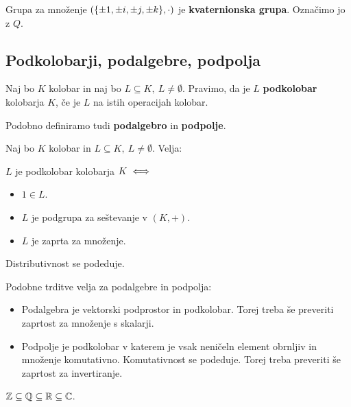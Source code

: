Grupa za množenje $(\{\pm 1, \pm i, \pm j, \pm k\}, \cdot)$ je \textbf{kvaternionska grupa}. Označimo jo z $Q$.

\subsection{Podkolobarji, podalgebre, podpolja}
\begin{definicija}
    Naj bo $K$ kolobar in naj bo $L \subseteq K, \ L \neq \emptyset$. Pravimo, da je $L$ \textbf{podkolobar} kolobarja $K$, če je $L$ na istih operacijah kolobar.
\end{definicija}

\begin{opomba}
    Podobno definiramo tudi \textbf{podalgebro} in \textbf{podpolje}.
\end{opomba}

\begin{trditev}
    Naj bo $K$ kolobar in $L \subseteq K, \ L \neq \emptyset$. Velja: 

    $L$ je podkolobar kolobarja $K \iff$
    \begin{itemize}
        \item $1 \in L$.
        \item $L$ je podgrupa za seštevanje v $(K,+)$.
        \item $L$ je zaprta za množenje.
    \end{itemize}
\end{trditev}

\begin{opomba}
    Distributivnost se podeduje.
\end{opomba}

\begin{opomba}
    Podobne trditve velja za podalgebre in podpolja:
    \begin{itemize}
        \item Podalgebra je vektorski podprostor in podkolobar. Torej treba še preveriti zaprtost za množenje s skalarji.
        \item Podpolje je podkolobar v katerem je vsak neničeln element obrnljiv in množenje komutativno. Komutativnost se podeduje. Torej treba preveriti še zaprtost za invertiranje.
    \end{itemize}
\end{opomba}

\begin{primer}
    $\mathbb{Z} \subseteq \mathbb{Q} \subseteq \mathbb{R} \subseteq \mathbb{C}$.
\end{primer}

